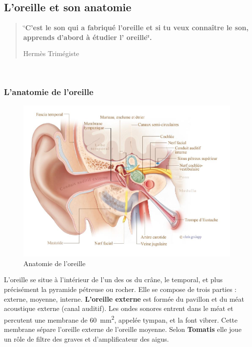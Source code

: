 \subsection {L'oreille et son anatomie}


\begin{quotation}
	\char`\"{}\textbf{C'est le son qui a fabriqué l'oreille et si tu veux connaître
		le son, apprends d'abord à étudier l\textquoteright
                oreille\char`\"{}.}

              
	Hermès Trimégiste 
\end{quotation}

\
\subsubsection{L'anatomie de l'oreille}

\begin{figure}
	\centering
	\includegraphics[width=1\linewidth]{images/20160624Berufsfeldgruppen.jpg}
	\caption[Anatomie oreille]{Anatomie de l'oreille}
	\label{fig:-20160624berufsfeldgruppen}
\end{figure}

L'oreille \autocite[ch. 8 pp. 319--321]{marieb:biologie} 
se situe à l'intérieur de l'un des os du crâne, le temporal, et plus précisément la pyramide pétreuse ou rocher. Elle se compose de trois parties : externe, moyenne, interne.
\textbf{L'oreille externe}\autocite[ch. 8, pp. 319--321.]{marieb:biologie}
est formée du pavillon et du méat acoustique externe
	(canal auditif). Les ondes sonores entrent dans le méat et percutent
	une membrane de \SI{60}{\milli\metre\squared}, appelée tympan, et la font vibrer. 
	Cette membrane
	sépare l'oreille externe de l'oreille moyenne. 
Selon \textbf{Tomatis} 
	elle joue un rôle de filtre des graves et d'amplificateur des aigus.

